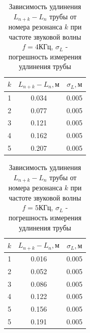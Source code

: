\begin{table}[h]
    \centering
    \begin{tabular}{|c|c|c|}
    \hline
    $k$ & $L_{n+k} - L_n, \text{м}$ & $\sigma_L, \text{м}$  \\ \hline
    1   & 0.034                     & 0.005  \\ \hline
    2   & 0.077                     & 0.005  \\ \hline
    3   & 0.121                     & 0.005  \\ \hline
    4   & 0.162                     & 0.005  \\ \hline
    5   & 0.207                     & 0.005  \\ \hline
\end{tabular}
    \caption{Зависимость удлинения $L_{n+k} - L_n$ трубы от номера резонанса $k$ при частоте звуковой волны $f = 4\text{КГц}$, $\sigma_L$ - погрешность измерения удлинения трубы}
    \label{tab:t3}
\end{table}

\begin{table}[h]
    \centering
    \begin{tabular}{|c|c|c|}
    \hline
    $k$ & $L_{n+k} - L_n, \text{м}$ & $\sigma_L, \text{м}$  \\ \hline
    1   & 0.016                     & 0.005  \\ \hline
    2   & 0.052                     & 0.005  \\ \hline
    3   & 0.086                     & 0.005  \\ \hline
    4   & 0.122                     & 0.005  \\ \hline
    5   & 0.156                     & 0.005  \\ \hline
    5   & 0.191                     & 0.005  \\ \hline
\end{tabular}
    \caption{Зависимость удлинения $L_{n+k} - L_n$ трубы от номера резонанса $k$ при частоте звуковой волны $f = 5\text{КГц}$, $\sigma_L$ - погрешность измерения удлинения трубы}
    \label{tab:t4}
\end{table}

